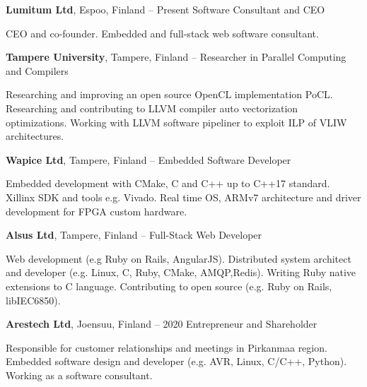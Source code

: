 \documentclass[letterpaper,MMMyyyy,nonstopmode]{simpleresumecv}
\begin{document}
\begin{Body}
\BigGap
\Entry
\textbf{Lumitum Ltd}, Espoo, Finland
\hfill
{} -- Present
\Gap
\BulletItem Software Consultant and CEO
\begin{Detail}
    \SubBulletItem CEO and co-founder.
    \SubBulletItem Embedded and full-stack web software consultant.
\end{Detail}

\textbf{Tampere University}, Tampere, Finland
\hfill
{} --  
\Gap
\BulletItem Researcher in Parallel Computing and Compilers
\begin{Detail}
    \SubBulletItem Researching and improving an open source OpenCL
    implementation PoCL.
    \SubBulletItem Researching and contributing to LLVM compiler auto
    vectorization optimizations.
    \SubBulletItem Working with LLVM software pipeliner to exploit ILP of VLIW
    architectures.
\end{Detail}

\BigGap
\Entry
\textbf{Wapice Ltd}, Tampere, Finland
\hfill
{} -- 
\Gap
\BulletItem Embedded Software Developer
\begin{Detail}
    \SubBulletItem Embedded development with CMake, C and C++ up to C++17 standard.
    \SubBulletItem Xillinx SDK and tools e.g. Vivado.
    \SubBulletItem Real time OS, ARMv7 architecture and driver development for FPGA custom hardware.
\end{Detail}

\BigGap
\Entry
\textbf{Alsus Ltd}, Tampere, Finland
\hfill
{} -- 
\Gap
\BulletItem Full-Stack Web Developer
\begin{Detail}
    \SubBulletItem Web development (e.g Ruby on Rails, AngularJS).
    \SubBulletItem Distributed system architect and developer (e.g. Linux, C, Ruby,
    CMake, AMQP,\newline  Redis).
    \SubBulletItem Writing Ruby native extensions to C language.
    \SubBulletItem Contributing to open source (e.g. Ruby on Rails, libIEC6850).
\end{Detail}

\BigGap
\Entry
\textbf{Arestech Ltd}, Joensuu, Finland
\hfill
{} -- 2020
\Gap
\BulletItem Entrepreneur and Shareholder
\begin{Detail}
    \SubBulletItem Responsible for customer relationships and meetings in
    Pirkanmaa region.
    \SubBulletItem Embedded software design and developer (e.g. AVR, Linux,
    C/C++, Python).
    \SubBulletItem Working as a software consultant.
\end{Detail}


\end{Body}
\end{document}
